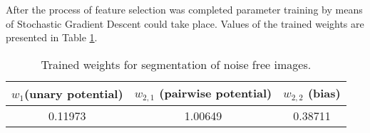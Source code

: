 After the process of feature selection was completed parameter training by means of Stochastic Gradient Descent could take place. Values of the trained weights are presented in Table \ref{table:weights_nonlinear_noise_free}.
\begin{table}[ht]
\caption{Trained weights for segmentation of noise free images.}
\centering
\begin{tabular}{|c|c|c|}
\hline
\rowcolor[HTML]{C0C0C0} 
$w_1$(unary potential) & $w_{2,1}$ (pairwise potential) & $w_{2,2}$ (bias) \\ \hline
0.11973 & 1.00649 & 0.38711 \\ \hline
\end{tabular}
\label{table:weights_nonlinear_noise_free}
\end{table}

